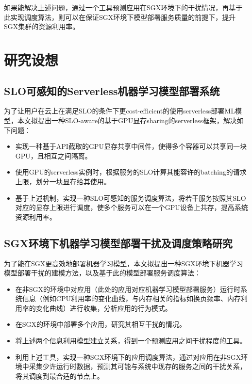 如果能解决上述问题，通过一个工具预测应用在SGX环境下的干扰情况，再基于此实现调度算法，则可以在保证SGX环境下模型部署服务质量的前提下，提升SGX集群的资源利用率。


\section{研究设想}

\subsection{SLO可感知的Serverless机器学习模型部署系统}
为了让用户在云上在满足SLO的条件下更cost-efficient的使用serverless部署ML模型，本文拟提出一种SLO-aware的基于GPU显存sharing的serverless框架，解决如下问题：
\begin{itemize}
    \item 实现一种基于API截取的GPU显存共享中间件，使得多个容器可以共享同一块GPU，且相互之间隔离。
    \item 使用GPU的serverless实例时，根据服务的SLO计算其能容许的batching的请求上限，划分一块显存给其使用。
    \item 基于上述机制，实现一种SLO可感知的服务调度算法，将若干服务按照其SLO对应的显存上限进行调度，使多个服务可以在一个GPU设备上共存，提高系统资源利用率。
\end{itemize}

\subsection{SGX环境下机器学习模型部署干扰及调度策略研究}
为了能在SGX更高效地部署机器学习模型，本文拟提出一种SGX环境下机器学习模型部署干扰的建模方法，以及基于此的模型部署服务调度算法：
\begin{itemize}
    \item 在非SGX的环境中对应用（此处的应用对应机器学习模型部署服务）运行时系统信息（例如CPU利用率的变化曲线，与内存相关的指标如换页频率、内存利用率的变化曲线）进行收集，分析应用的行为模式。
    \item 在SGX的环境中部署多个应用，研究其相互干扰的情况。
    \item 将上述两个信息利用模型建立关系，得到一个预测应用之间干扰程度的工具。
    \item 利用上述工具，实现一种SGX环境下的应用调度算法，通过对应用在非SGX环境中采集少许运行时数据，预测其可能与系统中现存的服务之间的干扰关系，将其调度到最合适的节点上。
\end{itemize}

